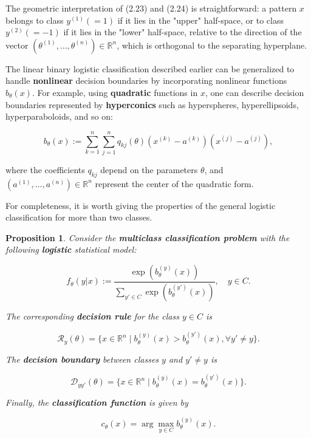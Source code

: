 \documentclass{report}
\newtheorem{proposition}{Proposition}[chapter]
\begin{document}
The geometric interpretation of (2.23) and (2.24) is straightforward: a pattern $x$ belongs to class $y^{(1)} (=1)$ if it lies in the "upper" half-space, or to class $y^{(2)}(=-1)$ if it lies in the "lower" half-space, relative to the direction of the vector $(\theta^{(1)},\dots,\theta^{(n)}) \in \mathbb{R}^n$, which is orthogonal to the separating hyperplane.

The linear binary logistic classification described earlier can be generalized to handle \textbf{nonlinear} decision boundaries by incorporating nonlinear functions $b_\theta(x)$. For example, using \textbf{quadratic} functions in $x$, one can describe decision boundaries represented by \textbf{hyperconics} such as hyperspheres, hyperellipsoids, hyperparaboloids, and so on:

\begin{equation}
b_\theta(x) := \sum_{k=1}^{n}\sum_{j=1}^{n}q_{kj}(\theta)(x^{(k)}-a^{(k)})(x^{(j)} - a^{(j)}),
\end{equation}

where the coefficients $q_{kj}$ depend on the parameters $\theta$, and $(a^{(1)},\dots,a^{(n)}) \in \mathbb{R}^n$ represent the center of the quadratic form.

For completeness, it is worth giving the properties of the general logistic classification for more than two classes.

\begin{proposition}
Consider the \textbf{multiclass classification problem} with the following \textbf{logistic} statistical model:

\begin{equation}
f_\theta(y|x) := \frac{\exp(b_\theta^{(y)}(x))}{\sum_{y' \in C}\exp(b_\theta^{(y')}(x))}, \quad y \in C.
\end{equation}

The corresponding \textbf{decision rule} for the class $y \in C$ is

\begin{equation}
\mathcal{R}_y(\theta) = \{x \in \mathbb{R}^n \mid b_\theta^{(y)}(x) > b_\theta^{(y')}(x), \forall y' \neq y\}.
\end{equation}

The \textbf{decision boundary} between classes $y$ and $y' \neq y$ is

\begin{equation}
\mathcal{D}_{yy'}(\theta) = \{x \in \mathbb{R}^n \mid b_\theta^{(y)}(x) = b_\theta^{(y')}(x)\}.
\end{equation}

Finally, the \textbf{classification function} is given by

\begin{equation}
c_\theta(x) = \arg \max_{y \in C} b_\theta^{(y)}(x).
\end{equation}
\end{proposition}
\end{document}
